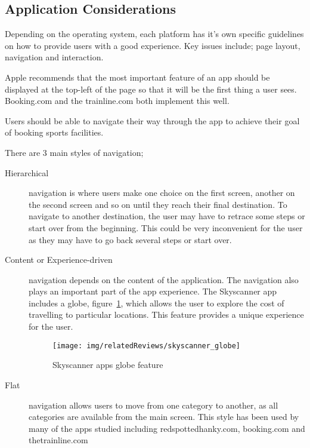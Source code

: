 \subsection{Application Considerations}
\label{sub:application_considerations}

Depending on the operating system, each platform has it's own specific
guidelines on how to provide users with a good experience. Key issues include;
page layout, navigation and interaction.

Apple recommends that the most important feature of an app should be displayed
at the top-left of the page so that it will be the first thing a user
sees\cite{HIGApple2013}.  Booking.com and the trainline.com both implement this
well\cite{BookingcomIOS}.

Users should be able to navigate their way through the app to achieve their
goal of booking sports facilities.

There are 3 main styles of navigation;
\begin{description}
	\item[Hierarchical] navigation is where users make one choice on the first
		screen, another on the second screen and so on until they reach their
		final destination. To navigate to another destination, the user may
		have to retrace some steps or start over from the beginning. This could
		be very inconvenient for the user as they may have to go back several
		steps or start over.
	\item[Content or Experience-driven] navigation depends on the content of
		the application. The navigation also plays an important part of the app
		experience. The Skyscanner app includes a globe,
		figure~\ref{fig:skyscanner_globe}, which allows the user to explore the
		cost of travelling to particular locations. This feature provides a
		unique experience for the user.
		\begin{figure}[htbp]
			\begin{center}
				\texttt{[image: img/relatedReviews/skyscanner\_globe]}
			\end{center}
			\caption{Skyscanner apps globe feature}\label{fig:skyscanner_globe}
		\end{figure}

	\item[Flat] navigation allows users to move from one category to another,
		as all categories are available from the main screen. This style has
		been used by many of the apps studied including redspottedhanky.com,
		booking.com and thetrainline.com
\end{description}

